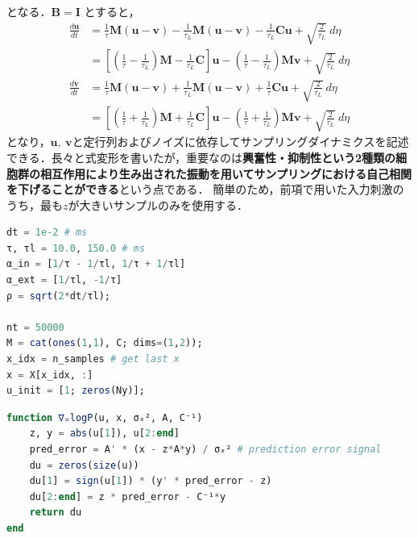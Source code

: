となる．$\mathbf{B = I}$ とすると，
\begin{align}
\frac{d\mathbf{u}}{dt} &= \frac{1}{\tau}\mathbf{M}\left( \mathbf{u} - \mathbf{v} \right) - \frac{1}{\tau_{L}}\mathbf{M}\left( \mathbf{u} - \mathbf{v} \right) - \frac{1}{\tau_{L}}\mathbf{Cu} + \sqrt{\frac{2}{\tau_{L}}}\ d\eta\\
&= \left\lbrack \left( \frac{1}{\tau} - \frac{1}{\tau_{L}} \right)\mathbf{M} - \frac{1}{\tau_{L}}\mathbf{C} \right\rbrack\mathbf{u} - \left( \frac{1}{\tau} - \frac{1}{\tau_{L}} \right)\mathbf{Mv} + \sqrt{\frac{2}{\tau_{L}}}\ d\eta\\
\frac{d\mathbf{v}}{dt} &= \frac{1}{\tau}\mathbf{M}\left( \mathbf{u} - \mathbf{v} \right) + \frac{1}{\tau_{L}}\mathbf{M}\left( \mathbf{u} - \mathbf{v} \right) + \frac{1}{\tau}\mathbf{Cu} + \sqrt{\frac{2}{\tau_{L}}}\ d\eta\\
&= \left\lbrack \left( \frac{1}{\tau} + \frac{1}{\tau_{L}} \right)\mathbf{M} + \frac{1}{\tau_{L}}\mathbf{C} \right\rbrack\mathbf{u} - \left( \frac{1}{\tau} + \frac{1}{\tau_{L}} \right)\mathbf{Mv} + \sqrt{\frac{2}{\tau_{L}}}\ d\eta
\end{align}
となり，$\mathbf{u}\mathbf{,\ v}$と定行列およびノイズに依存してサンプリングダイナミクスを記述できる．長々と式変形を書いたが，重要なのは\textbf{興奮性・抑制性という2種類の細胞群の相互作用により生み出された振動を用いてサンプリングにおける自己相関を下げることができる}という点である．
簡単のため，前項で用いた入力刺激のうち，最も$z$が大きいサンプルのみを使用する．
\begin{lstlisting}[language=julia]
dt = 1e-2 # ms
τ, τl = 10.0, 150.0 # ms
α_in = [1/τ - 1/τl, 1/τ + 1/τl]
α_ext = [1/τl, -1/τ]
ρ = sqrt(2*dt/τl);

nt = 50000
M = cat(ones(1,1), C; dims=(1,2));
x_idx = n_samples # get last x
x = X[x_idx, :]
u_init = [1; zeros(Ny)];
\end{lstlisting}
\begin{lstlisting}[language=julia]
function ∇ᵤlogP(u, x, σₓ², A, C⁻¹)
    z, y = abs(u[1]), u[2:end]
    pred_error = A' * (x - z*A*y) / σₓ² # prediction error signal
    du = zeros(size(u))
    du[1] = sign(u[1]) * (y' * pred_error - z)
    du[2:end] = z * pred_error - C⁻¹*y
    return du
end
\end{lstlisting}
